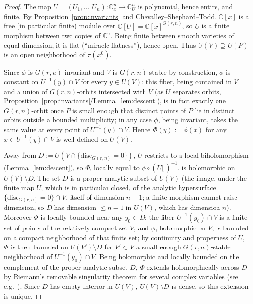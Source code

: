 \documentclass[11pt]{article}
\theoremstyle{remark}
\newcommand{\CC}{\mathbb{C}}
\begin{document}
\begin{proof}
The map $U=(U_1,\dots,U_n):\CC^n_x\to\CC^n_U$ is polynomial, hence entire, and finite. By Proposition~\ref{prop:invariants} and Chevalley--Shephard--Todd, $\CC[x]$ is a free (in particular finite) module over $\CC[U]=\CC[x]^{G(r,n)}$, so $U$ is a finite morphism between two copies of $\CC^n$. Being finite between smooth varieties of equal dimension, it is flat (``miracle flatness''), hence open. Thus $U(V)\supseteq U(P)$ is an open neighborhood of $\pi(x^0)$.

Since $\phi$ is $G(r,n)$-invariant and $V$ is $G(r,n)$-stable by construction, $\phi$ is constant on $U^{-1}(y)\cap V$ for every $y\in U(V)$: this fiber, being contained in $V$ and a union of $G(r,n)$-orbits intersected with $V$ (as $U$ separates orbits, Proposition~\ref{prop:invariants}/Lemma~\ref{lem:descent}), is in fact exactly one $G(r,n)$-orbit once $P$ is small enough that distinct points of $P$ lie in distinct orbits outside a bounded multiplicity; in any case $\phi$, being invariant, takes the same value at every point of $U^{-1}(y)\cap V$. Hence $\Phi(y):=\phi(x)$ for any $x\in U^{-1}(y)\cap V$ is well defined on $U(V)$.

Away from $D:=U(V\cap\{\mathrm{disc}_{G(r,n)}=0\})$, $U$ restricts to a local biholomorphism (Lemma~\ref{lem:descent}), so $\Phi$, locally equal to $\phi\circ(U|_\cdot)^{-1}$, is holomorphic on $U(V)\setminus D$. The set $D$ is a proper analytic subset of $U(V)$ (the image, under the finite map $U$, which is in particular closed, of the analytic hypersurface $\{\mathrm{disc}_{G(r,n)}=0\}\cap V$, itself of dimension $n-1$; a finite morphism cannot raise dimension, so $D$ has dimension $\le n-1$ in $U(V)$, which has dimension $n$). Moreover $\Phi$ is locally bounded near any $y_0\in D$: the fiber $U^{-1}(y_0)\cap V$ is a finite set of points of the relatively compact set $V$, and $\phi$, holomorphic on $V$, is bounded on a compact neighborhood of that finite set; by continuity and properness of $U$, $\Phi$ is then bounded on $U(V')\setminus D$ for $V'\subset V$ a small enough $G(r,n)$-stable neighborhood of $U^{-1}(y_0)\cap V$. Being holomorphic and locally bounded on the complement of the proper analytic subset $D$, $\Phi$ extends holomorphically across $D$ by Riemann's removable singularity theorem for several complex variables (see e.g.\ \cite{GH}). Since $D$ has empty interior in $U(V)$, $U(V)\setminus D$ is dense, so this extension is unique.
\end{proof}
\end{document}
